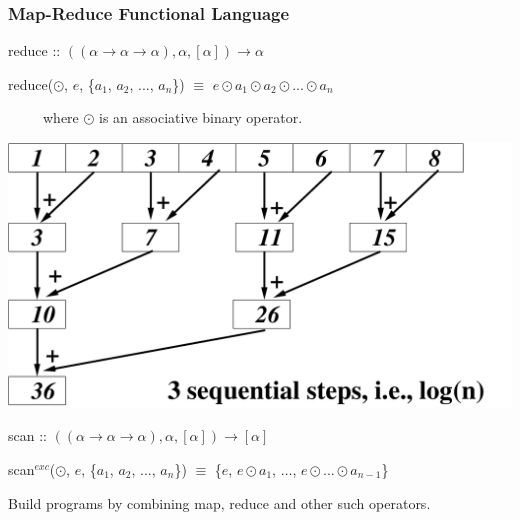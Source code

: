 \documentclass{beamer}
\renewcommand{\emph}[1]{\textcolor{structure}{#1}}
\newcommand{\emp}[1]{\textcolor{DikuRed}{ #1}}
\begin{document}
\begin{frame}[fragile,t]
   \frametitle{Map-Reduce Functional Language}

\bigskip

\emp{reduce} :: $((\alpha \rightarrow \alpha \rightarrow \alpha), \alpha, [\alpha]) \rightarrow \alpha$

\smallskip

\emp{reduce}($\odot$, $e$, \{$a_1$, $a_2$, ..., $a_n$\}) $\equiv$ \emph{$e \odot a_1 \odot a_2 \odot ... \odot a_n$}

\smallskip

~~~~~where $\odot$ is an associative binary operator.

\bigskip

\begin{center} 
        \includegraphics[height=18ex]{Figures/ReduceEg.pdf} 
\end{center}\bigskip

\emp{scan} :: $((\alpha \rightarrow \alpha \rightarrow \alpha), \alpha, [\alpha]) \rightarrow [\alpha]$

\smallskip

\emp{scan$^{exc}$}($\odot$, $e$, \{$a_1$, $a_2$, ..., $a_n$\}) $\equiv$ \emph{\{$e$, $e \odot a_1$, $\ldots$, $e \odot ... \odot a_{n-1}$\}}


Build programs by combining \emp{map}, \emp{reduce} and other such operators. %

\end{frame}
\end{document}
